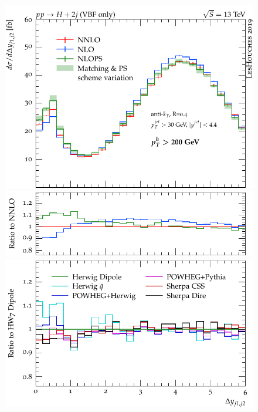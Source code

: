 \documentclass[10pt,prd,fleqn,superscriptaddress,notitlepage,nofootinbib,preprintnumbers,nobalancelastpage]{revtex4-1}
\begin{document}
\begin{figure}[tp]
\begin{minipage}{.32\textwidth}
    \includegraphics[width=\textwidth]{figures/tools/delta_y_jj12_pth200.pdf}
    \includegraphics[width=\textwidth]{figures/tools/delta_y_jj12_pth200_rFO.pdf}
    \includegraphics[width=\textwidth]{figures/tools/delta_y_jj12_pth200_rMC.pdf}
  \end{minipage}\hfill
  \begin{minipage}{.32\textwidth}

\end{minipage}
\end{figure}
\end{document}

